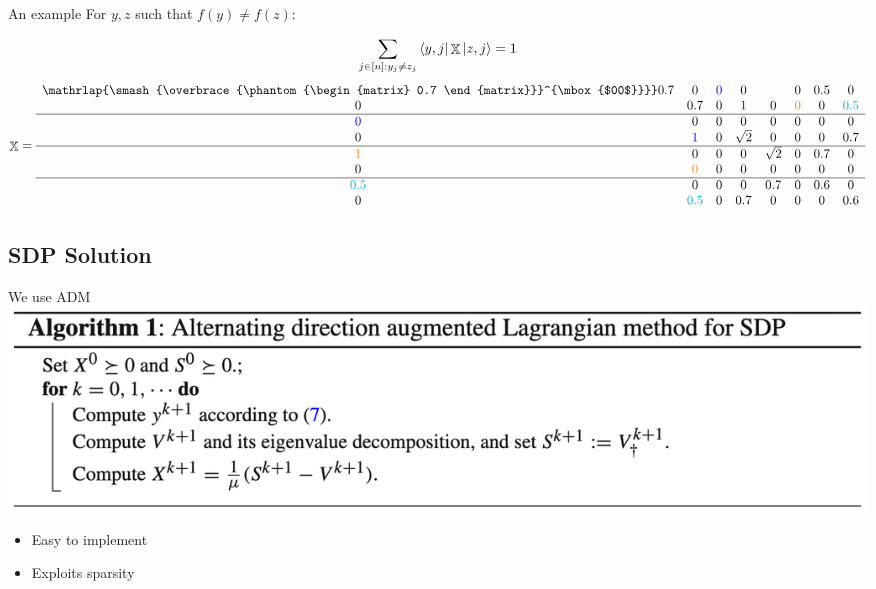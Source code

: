 \documentclass[12pt]{beamer}
\DeclareMathOperator{\X}{\mathbb{X}}		     %
\newcommand\coolover[2]{\mathrlap{\smash{\overbrace{\phantom{%
    \begin{matrix} #2 \end{matrix}}}^{\mbox{$#1$}}}}#2}
\begin{document}
\begin{frame}{An example}
    For $y,z$ such that $f(y) \neq f(z)$:
    
    \begin{align}
         \sum_{j \in [n]: y_j \ne z_j} 
    \bra{y,j} \X \ket{z, j} = 1 \nonumber
    \end{align}
    \begin{align}
    \X = \begin{array}{cccccccc}
    \coolover{00}{0.7} & 0 & \color{blue}0 & 0 &  & 0 & 0.5 & 0\\
    0 & 0.7 & 0 & \color{blue}1 & 0 & \color{orange}0 & 0 & \color{cyan}0.5\\
    \hline
    \color{blue}0 & 0 & 0 & 0 & 0 & 0 & 0 & 0\\
    0 & \color{blue}1 & 0 & \sqrt{2} & 0 & 0 & 0 & 0.7\\
    \hline
    \color{orange}1 & 0 & 0 & 0 & \sqrt{2} & 0 & 0.7 & 0\\
    0 & \color{orange}0 & 0 & 0 & 0 & 0 & 0 & 0\\
    \hline
    \color{cyan}0.5 & 0 & 0 & 0 & 0.7 & 0 & 0.6 & 0\\
    0 & \color{cyan}0.5 & 0 & 0.7 & 0 & 0 & 0 & 0.6\\
    \end{array} \nonumber
\end{align}
\end{frame}


\subsection{SDP Solution}
\begin{frame}{We use ADM \cite{adm}}
\centering
\includegraphics[scale=.15]{figures/adm_algorithm}
\bigskip
\begin{itemize}
    \item Easy to implement
    \item Exploits sparsity
\end{itemize}
\end{frame}
\end{document}

